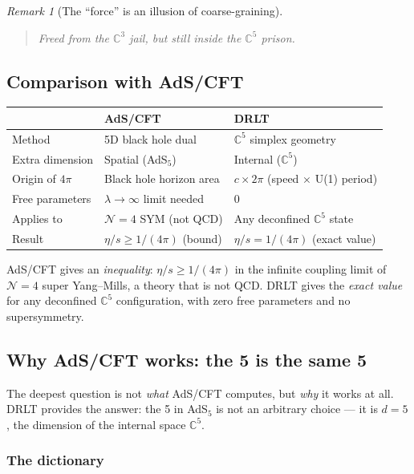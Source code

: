 \documentclass[12pt]{article}
\theoremstyle{remark}
\newtheorem{remark}[theorem]{Remark}
\theoremstyle{definition}
\newcommand{\CC}{\mathbb{C}}
\begin{document}
\begin{remark}[The ``force'' is an illusion of coarse-graining]
\begin{quote}
\emph{Freed from the $\CC^3$ jail, but still inside the $\CC^5$ prison.}
\end{quote}

\subsection{Comparison with AdS/CFT}

\begin{center}
\begin{tabular}{lll}
\hline
& AdS/CFT & DRLT \\
\hline
Method & 5D black hole dual & $\CC^5$ simplex geometry \\
Extra dimension & Spatial (AdS$_5$) & Internal ($\CC^5$) \\
Origin of $4\pi$ & Black hole horizon area & $c \times 2\pi$ (speed $\times$ U(1) period) \\
Free parameters & $\lambda \to \infty$ limit needed & 0 \\
Applies to & $\mathcal{N}{=}4$ SYM (not QCD) & Any deconfined $\CC^5$ state \\
Result & $\eta/s \geq 1/(4\pi)$ (bound) & $\eta/s = 1/(4\pi)$ (exact value) \\
\hline
\end{tabular}
\end{center}

AdS/CFT gives an \emph{inequality}: $\eta/s \geq 1/(4\pi)$ in the infinite coupling limit of $\mathcal{N} = 4$ super Yang--Mills, a theory that is not QCD. DRLT gives the \emph{exact value} for any deconfined $\CC^5$ configuration, with zero free parameters and no supersymmetry.

\subsection{Why AdS/CFT works: the 5 is the same 5}

The deepest question is not \emph{what} AdS/CFT computes, but \emph{why} it works at all. DRLT provides the answer: the 5 in AdS$_5$ is not an arbitrary choice --- it is $d = 5$, the dimension of the internal space $\CC^5$.

\subsubsection{The dictionary}


\end{remark}
\end{document}
